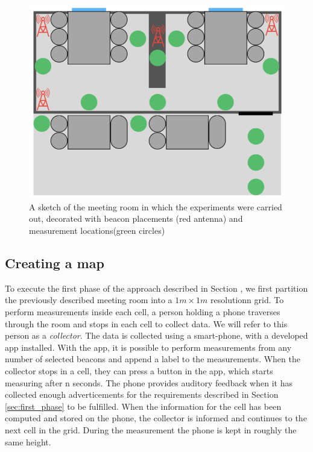 \begin{figure}[h]
    \centering
    \includegraphics[scale=0.7]{images/experiment_setup.png}
    \caption{A sketch of the meeting room in which the experiments were carried out, decorated with beacon placements (red antenna) and measurement locations(green circles)}
    \label{fig:experiment_setup}
\end{figure}

\subsection{Creating a map}
To execute the first phase of the approach described in Section \label{sec:first_phase}, we first partition the previously described meeting room into a $1m \times 1m$ resolutionn grid.
To perform measurements inside each cell, a person holding a phone traverses through the room and stops in each cell to collect data. We will refer to this person as a \textit{collector}.
The data is collected using a smart-phone, with a developed app installed.   
With the app, it is possible to perform measurements from any number of selected beacons and append a label to the measurements.
When the collector stops in a cell, they can press a button in the app, which starts measuring after n seconds. 
The phone provides auditory feedback when it has collected enough adverticements for the requirements described in Section \ref{sec:first_phase} to be fulfilled.
When the information for the cell has been computed and stored on the phone, the collector is informed and continues to the next cell in the grid. 
During the measurement the phone is kept in roughly the same height.


